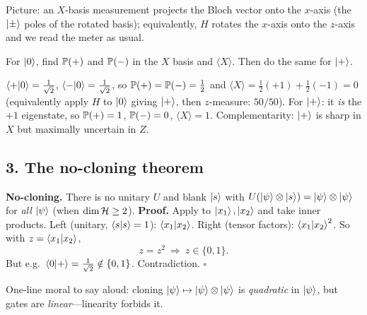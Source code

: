 \documentclass[11pt]{article}
\begin{document}
\noindent Picture: an $X$-basis measurement projects the Bloch vector onto the
$x$-axis (the $\ket{\pm}$ poles of the rotated basis); equivalently, $H$ rotates the
$x$-axis onto the $z$-axis and we read the meter as usual.
\begin{center}
\end{center}

\begin{inclass}\label{ic:xbasis}
For $\ket0$, find $\mathbb{P}(+)$ and $\mathbb{P}(-)$ in the $X$ basis and $\langle X\rangle$.
Then do the same for $\ket{+}$.
\end{inclass}
\begin{answer}
$\braket{+|0}=\tfrac1{\sqrt2}$, $\braket{-|0}=\tfrac1{\sqrt2}$, so
$\mathbb{P}(+)=\mathbb{P}(-)=\tfrac12$ and $\langle X\rangle=\tfrac12(+1)+\tfrac12(-1)=0$
(equivalently apply $H$ to $\ket0$ giving $\ket{+}$, then $z$-measure: $50/50$).
For $\ket{+}$: it \emph{is} the $+1$ eigenstate, so $\mathbb{P}(+)=1$, $\mathbb{P}(-)=0$,
$\langle X\rangle=1$. Complementarity: $\ket{+}$ is sharp in $X$ but maximally
uncertain in $Z$.
\end{answer}

\subsection*{3. The no-cloning theorem }
\begin{board}
\textbf{No-cloning.} There is no unitary $U$ and blank $\ket s$ with
$U(\ket\psi\otimes\ket s)=\ket\psi\otimes\ket\psi$ for \emph{all} $\ket\psi$
(when $\dim\mathcal{H}\ge2$).
\textbf{Proof.} Apply to $\ket{x_1},\ket{x_2}$ and take inner products.
Left (unitary, $\braket{s|s}=1$): $\braket{x_1|x_2}$.
Right (tensor factors): $\braket{x_1|x_2}^2$. So with $z=\braket{x_1|x_2}$,
\[
  z=z^2\ \Rightarrow\ z\in\{0,1\}.
\]
But e.g.\ $\braket{0|+}=\tfrac1{\sqrt2}\notin\{0,1\}$. Contradiction. $\square$
\end{board}
One-line moral to say aloud: cloning $\ket\psi\mapsto\ket\psi\otimes\ket\psi$ is
\emph{quadratic} in $\ket\psi$, but gates are \emph{linear}---linearity forbids it.
\end{document}
